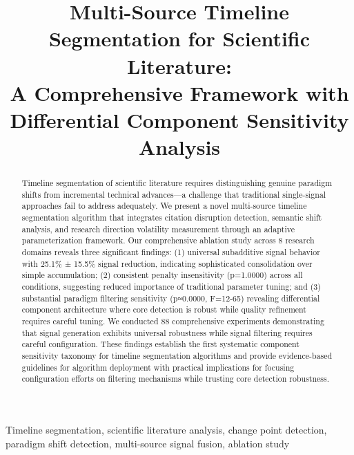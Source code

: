 \documentclass[conference]{IEEEtran}
\begin{document}
\title{Multi-Source Timeline Segmentation for Scientific Literature: \\
A Comprehensive Framework with Differential Component Sensitivity Analysis}

\author{
}

\maketitle

\begin{abstract}
Timeline segmentation of scientific literature requires distinguishing genuine paradigm shifts from incremental technical advances—a challenge that traditional single-signal approaches fail to address adequately. We present a novel multi-source timeline segmentation algorithm that integrates citation disruption detection, semantic shift analysis, and research direction volatility measurement through an adaptive parameterization framework. Our comprehensive ablation study across 8 research domains reveals three significant findings: (1) universal subadditive signal behavior with 25.1\% ± 15.5\% signal reduction, indicating sophisticated consolidation over simple accumulation; (2) consistent penalty insensitivity (p=1.0000) across all conditions, suggesting reduced importance of traditional parameter tuning; and (3) substantial paradigm filtering sensitivity (p≈0.0000, F=12-65) revealing differential component architecture where core detection is robust while quality refinement requires careful tuning. We conducted 88 comprehensive experiments demonstrating that signal generation exhibits universal robustness while signal filtering requires careful configuration. These findings establish the first systematic component sensitivity taxonomy for timeline segmentation algorithms and provide evidence-based guidelines for algorithm deployment with practical implications for focusing configuration efforts on filtering mechanisms while trusting core detection robustness.
\end{abstract}

\begin{IEEEkeywords}
Timeline segmentation, scientific literature analysis, change point detection, paradigm shift detection, multi-source signal fusion, ablation study
\end{IEEEkeywords}
\end{document}
